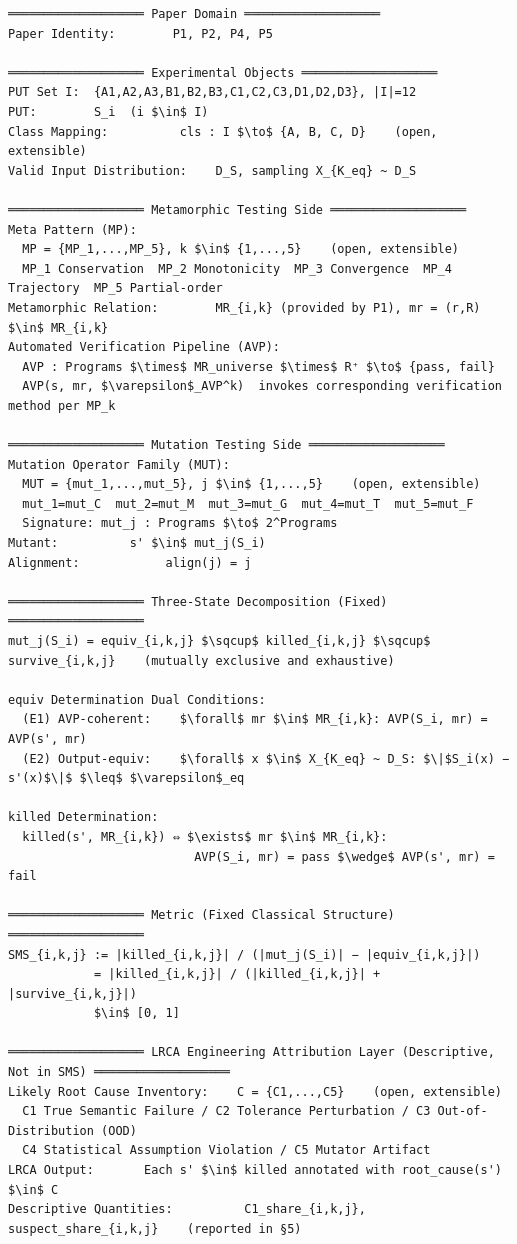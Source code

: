 \documentclass[review,12pt,authoryear]{elsarticle}
\begin{document}
\begin{verbatim}
═══════════════════ Paper Domain ═══════════════════
Paper Identity:        P1, P2, P4, P5

═══════════════════ Experimental Objects ═══════════════════
PUT Set I:  {A1,A2,A3,B1,B2,B3,C1,C2,C3,D1,D2,D3}, |I|=12
PUT:        S_i  (i $\in$ I)
Class Mapping:          cls : I $\to$ {A, B, C, D}    (open, extensible)
Valid Input Distribution:    D_S, sampling X_{K_eq} ~ D_S

═══════════════════ Metamorphic Testing Side ═══════════════════
Meta Pattern (MP):
  MP = {MP_1,...,MP_5}, k $\in$ {1,...,5}    (open, extensible)
  MP_1 Conservation  MP_2 Monotonicity  MP_3 Convergence  MP_4 Trajectory  MP_5 Partial-order
Metamorphic Relation:        MR_{i,k} (provided by P1), mr = (r,R) $\in$ MR_{i,k}
Automated Verification Pipeline (AVP):
  AVP : Programs $\times$ MR_universe $\times$ R⁺ $\to$ {pass, fail}
  AVP(s, mr, $\varepsilon$_AVP^k)  invokes corresponding verification method per MP_k

═══════════════════ Mutation Testing Side ═══════════════════
Mutation Operator Family (MUT):
  MUT = {mut_1,...,mut_5}, j $\in$ {1,...,5}    (open, extensible)
  mut_1=mut_C  mut_2=mut_M  mut_3=mut_G  mut_4=mut_T  mut_5=mut_F
  Signature: mut_j : Programs $\to$ 2^Programs
Mutant:          s' $\in$ mut_j(S_i)
Alignment:            align(j) = j

═══════════════════ Three-State Decomposition (Fixed) ═══════════════════
mut_j(S_i) = equiv_{i,k,j} $\sqcup$ killed_{i,k,j} $\sqcup$ survive_{i,k,j}    (mutually exclusive and exhaustive)

equiv Determination Dual Conditions:
  (E1) AVP-coherent:    $\forall$ mr $\in$ MR_{i,k}: AVP(S_i, mr) = AVP(s', mr)
  (E2) Output-equiv:    $\forall$ x $\in$ X_{K_eq} ~ D_S: $\|$S_i(x) − s'(x)$\|$ $\leq$ $\varepsilon$_eq

killed Determination:
  killed(s', MR_{i,k}) ⇔ $\exists$ mr $\in$ MR_{i,k}:
                          AVP(S_i, mr) = pass $\wedge$ AVP(s', mr) = fail

═══════════════════ Metric (Fixed Classical Structure) ═══════════════════
SMS_{i,k,j} := |killed_{i,k,j}| / (|mut_j(S_i)| − |equiv_{i,k,j}|)
            = |killed_{i,k,j}| / (|killed_{i,k,j}| + |survive_{i,k,j}|)
            $\in$ [0, 1]

═══════════════════ LRCA Engineering Attribution Layer (Descriptive, Not in SMS) ═══════════════════
Likely Root Cause Inventory:    C = {C1,...,C5}    (open, extensible)
  C1 True Semantic Failure / C2 Tolerance Perturbation / C3 Out-of-Distribution (OOD)
  C4 Statistical Assumption Violation / C5 Mutator Artifact
LRCA Output:       Each s' $\in$ killed annotated with root_cause(s') $\in$ C
Descriptive Quantities:          C1_share_{i,k,j}, suspect_share_{i,k,j}    (reported in §5)


\end{verbatim}
\end{document}
